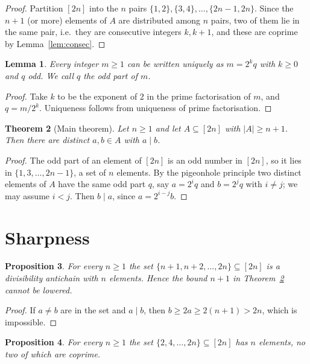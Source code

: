 \documentclass[11pt]{amsart}
\newtheorem{theorem}{Theorem}[section]
\newtheorem{lemma}[theorem]{Lemma}
\newtheorem{proposition}[theorem]{Proposition}
\theoremstyle{definition}
\theoremstyle{remark}
\begin{document}
\begin{proof}
Partition $[2n]$ into the $n$ pairs $\{1,2\},\{3,4\},\dots,\{2n-1,2n\}$. Since
the $n+1$ (or more) elements of $A$ are distributed among $n$ pairs, two of
them lie in the same pair, i.e.\ they are consecutive integers $k,k+1$, and
these are coprime by Lemma~\ref{lem:consec}.
\end{proof}

\begin{lemma}\label{lem:oddpart}
Every integer $m\ge 1$ can be written uniquely as $m=2^{k}q$ with $k\ge 0$ and
$q$ odd. We call $q$ the \emph{odd part} of $m$.
\end{lemma}

\begin{proof}
Take $k$ to be the exponent of $2$ in the prime factorisation of $m$, and
$q=m/2^k$. Uniqueness follows from uniqueness of prime factorisation.
\end{proof}

\begin{theorem}[Main theorem]\label{thm:main}
Let $n\ge 1$ and let $A\subseteq[2n]$ with $|A|\ge n+1$. Then there are
distinct $a,b\in A$ with $a\mid b$.
\end{theorem}

\begin{proof}
The odd part of an element of $[2n]$ is an odd number in $[2n]$, so it lies
in $\{1,3,\dots,2n-1\}$, a set of $n$ elements. By the pigeonhole principle
two distinct elements of $A$ have the same odd part $q$, say $a=2^{i}q$ and
$b=2^{j}q$ with $i\ne j$; we may assume $i<j$. Then $b\mid a$, since
$a=2^{i-j}b$.
\end{proof}

\section{Sharpness}

\begin{proposition}\label{prop:sharpdiv}
For every $n\ge 1$ the set $\{n+1,n+2,\dots,2n\}\subseteq[2n]$ is a
divisibility antichain with $n$ elements. Hence the bound $n+1$ in
Theorem~\ref{thm:main} cannot be lowered.
\end{proposition}

\begin{proof}
If $a\ne b$ are in the set and $a\mid b$, then $b\ge 2a\ge 2(n+1)>2n$, which is
impossible.
\end{proof}

\begin{proposition}\label{prop:sharpcop}
For every $n\ge 1$ the set $\{2,4,\dots,2n\}\subseteq[2n]$ has $n$ elements,
no two of which are coprime.
\end{proposition}
\end{document}
